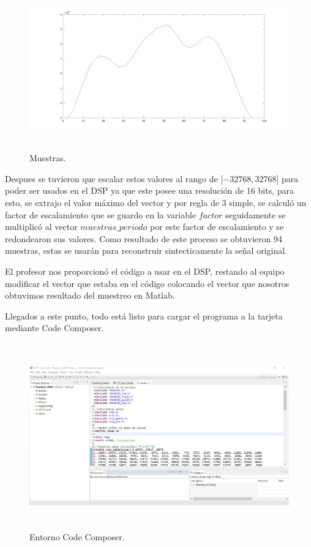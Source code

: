 \documentclass[12pt]{article}
\begin{document}
\begin{figure}[h]
    \centering
        \includegraphics[width=15cm,height=7cm]{muestras.jpg}
        \caption{Muestras.}
\end{figure}

Despues se tuvieron que escalar estos valores al rango de $\lbrack-32768,32768 \rbrack$ para poder ser usados en el DSP ya que este posee una resolución de 16 bits, para esto, se extrajo el valor máximo del vector y por regla de 3 simple, se calculó un factor de escalamiento que se guardo en la variable $factor$ seguidamente se multiplicó al vector $muestras\_periodo$ por este factor de escalamiento y se redondearon sus valores. Como resultado de este proceso se obtuvieron 94 muestras, estas se usarán para reconstruir sintecticamente la señal original.

El profesor nos proporcionó el código a usar en el DSP, restando al equipo modificar el vector que estaba en el código colocando el vector que nosotros obtuvimos resultado del muestreo en Matlab.



Llegados a este punto, todo está listo para cargar el programa a la tarjeta mediante Code Composer.


\begin{figure}[h]
    \centering
        \includegraphics[width=15cm,height=8cm]{code_composer.jpg}
        \caption{Entorno Code Composer.}
\end{figure}
\end{document}
